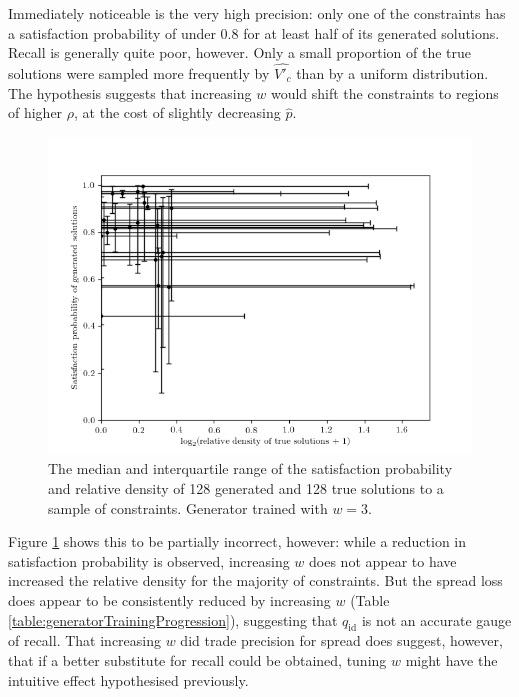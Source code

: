 \documentclass[../../main.tex]{subfiles}
\begin{document}
Immediately noticeable is the very high precision: only one of the constraints has a satisfaction probability of under $0.8$ for at least half of its generated solutions.
Recall is generally quite poor, however.
Only a small proportion of the true solutions were sampled more frequently by $\hat{V'_c}$ than by a uniform distribution.
The hypothesis suggests that increasing $w$ would shift the constraints to regions of higher $\rho$, at the cost of slightly decreasing $\hat{p}$.
\begin{figure}[H]
    \begin{center}
    \includegraphics[width=\textwidth]{solutionPropertiesW3}
    \caption[Satisfaction probability and relative density for high $w$]{
        The median and interquartile range of the satisfaction probability and relative density of 128 generated and 128 true solutions to a sample of constraints.
        Generator trained with $w=3$.
    }
    \label{fig:solutionPropertiesW3}
    \end{center}
\end{figure}
Figure \ref{fig:solutionPropertiesW3} shows this to be partially incorrect, however: while a reduction in satisfaction probability is observed, increasing $w$ does not appear to have increased the relative density for the majority of constraints.
But the spread loss does appear to be consistently reduced by increasing $w$ (Table \ref{table:generatorTrainingProgression}), suggesting that $q_\text{id}$ is not an accurate gauge of recall.
That increasing $w$ did trade precision for spread does suggest, however, that if a better substitute for recall could be obtained, tuning $w$ might have the intuitive effect hypothesised previously.
\end{document}
